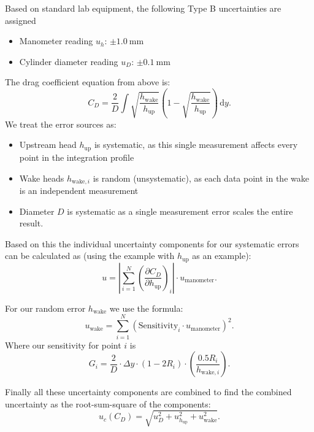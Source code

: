 \begin{derivation}
    Based on standard lab equipment, the following Type B uncertainties are assigned
    \begin{itemize}
      \item Manometer reading $u_h$: $\pm \qty{1,0}{\mm}$
      \item Cylinder diameter reading $u_D$: $\pm \qty{0,1}{\mm}$
    \end{itemize}
    The drag coefficient equation from above is:
    \begin{equation*}
      C_D = \frac{2}{D} \int \sqrt{\frac{h_{\mathrm{wake}}}{h_{\text{up}}}} \left( 1 - \sqrt{\frac{h_{\text{wake}}}{h_{\text{up}}}} \right) \, \mathrm{d}y 
    .\end{equation*}
    We treat the error sources as:
    \begin{itemize}
      \item Upstream head $h_{\mathrm{up}}$ is systematic, as this single measurement affects every point in the integration profile
      \item Wake heads $h_{\text{wake}, i}$ is random (unsystematic), as each data point in the wake is an independent measurement
      \item Diameter $D$ is systematic as a single measurement error scales the entire result.
    \end{itemize}
    Based on this the individual uncertainty components for our systematic errors can be calculated as (using the example with $h_{\text{up}}$ as an example):
    \begin{equation*}
      u = \left| \sum_{i = 1}^{N} \left( \frac{\partial C_D}{\partial h_{\text{up}}}  \right)_i \right| \cdot u_{\text{manometer}}
    .\end{equation*}
    
    For our random error $h_{\mathrm{wake}}$ we use the formula:
    \begin{equation*}
      u_{\text{wake}} = \sum_{i = 1}^{N} \left( \text{Sensitivity}_i \cdot u_{\text{manometer}} \right)^2
    .\end{equation*}
    Where our sensitivity for point $i$ is
    \begin{equation*}
      G_i = \frac{2}{D} \cdot \Delta y \cdot \left( 1 - 2 R_i \right) \cdot \left( \frac{\num{0,5} R_i}{h_{\text{wake}, i}} \right)
    .\end{equation*}

    Finally all these uncertainty components are combined to find the combined uncertainty as the root-sum-square of the components:
    \begin{equation*}
      u_c \left( C_D \right) = \sqrt{u^2_D + u^2_{h_{\text{up}}} + u^2_{\text{wake}}}
    .\end{equation*}
    

\end{derivation}
